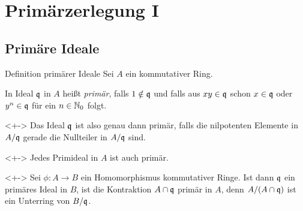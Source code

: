 \section{Primärzerlegung I}

\subsection{Primäre Ideale}


\begin{frame}{Definition primärer Ideale}
	Sei \(A\) ein kommutativer Ring.
	\begin{definition}
		In Ideal \(\mathfrak{q}\) in \(A\) heißt \emph{primär}, falls \(1 \notin \mathfrak{q}\) und falls aus \(x y \in
		\mathfrak{q}\) schon \(x \in \mathfrak{q}\) oder \(y^n \in \mathfrak{q}\) für ein \(n \in \mathbb N_0\) folgt.
	\end{definition}
	\begin{visibleenv}<+->
		Das Ideal \(\mathfrak{q}\) ist also genau dann primär, falls die nilpotenten Elemente in \(A/\mathfrak{q}\) gerade die
		Nullteiler in \(A/\mathfrak{q}\) sind.
	\end{visibleenv}
	\begin{example}<+->
		Jedes Primideal in \(A\) ist auch primär.
	\end{example}
	\begin{example}<+->
		Sei \(\phi\colon A \to B\) ein Homomorphismus kommutativer Ringe. Ist dann \(\mathfrak{q}\) ein primäres Ideal in
		\(B\), ist die Kontraktion \(A \cap \mathfrak{q}\) primär in \(A\), denn \(A/(A \cap \mathfrak{q})\) ist ein Unterring
		von \(B/\mathfrak{q}\).
	\end{example}
\end{frame}

